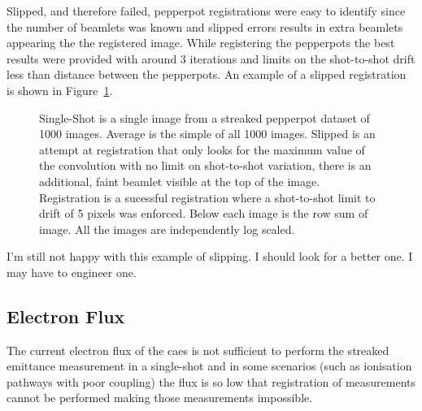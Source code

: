 Slipped, and therefore failed, pepperpot registrations were easy to identify since the number of beamlets was known and slipped errors results in extra beamlets appearing the the registered image.
While registering the pepperpots the best results were provided with around 3 iterations and limits on the shot-to-shot drift less than distance between the pepperpots.
An example of a slipped registration is shown in Figure~\ref{figure:registration_examples}.

\begin{figure}
    \center
    
    \caption{Single-Shot is a single image from a streaked pepperpot dataset of 1000 images. Average is the simple of all 1000 images. Slipped is an attempt at registration that only looks for the maximum value of the convolution with no limit on shot-to-shot variation, there is an additional, faint beamlet visible at the top of the image. Registration is a sucessful registration where a shot-to-shot limit to drift of 5 pixels was enforced. Below each image is the row sum of image. All the images are independently log scaled.}
    \label{figure:registration_examples}
\end{figure}

{\color{red} I'm still not happy with this example of slipping. I should look for a better one. I may have to engineer one.}

\subsection{Electron Flux}
The current electron flux of the \gls{caes} is not sufficient to perform the streaked emittance measurement in a single-shot and in some scenarios (such as ionisation pathways with poor coupling) the flux is so low that registration of measurements cannot be performed making those measurements impossible.


